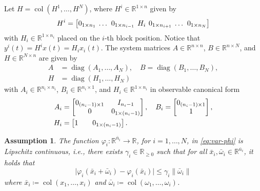 \documentclass[journal]{IEEEtran}
\newtheorem{assumption}{Assumption}
\newcommand{\diag}{\operatorname{diag}}	%
\newcommand{\col}{\operatorname{col}}
\def\colsep{\setlength\arraycolsep}
\begin{document}
Let $H = \col(H^{1},\ldots,H^{N})$, where $H^i \in \mathbb{R}^{1 \times n}$ given by
\begin{equation*}
H^i=\colsep{2pt}\begin{bmatrix}
    0_{1\times n_1} & \dots & 0_{1\times n_{i-1}} & H_i & 0_{1\times n_{i+1}} & \dots & 0_{1\times n_N}
\end{bmatrix}
\end{equation*}
with $H_i\in\mathbb R^{1\times n_i}$ placed on the $i$-th block position. Notice that 
$y^i(t) = H^i x(t) = H_i x_i(t)$. The system matrices ${A\in\mathbb{R}^{n\times n}}$, $B\in\mathbb{R}^{n\times N}$, and $H\in\mathbb{R}^{N\times n}$ are given by
\begin{align*}
    A& = \diag(A_1,\ldots,A_N), \quad B = \diag(B_1,\ldots,B_N), \\
    H& = \diag(H_1, \ldots, H_N)
\end{align*}
with $A_i \in \mathbb{R}^{n_i \times n_i}$, $B_i \in \mathbb{R}^{n_i \times 1}$, and $H_i \in \mathbb{R}^{1 \times n_i}$ in observable canonical form
\begin{align*}
 A_i &=
    \begin{bmatrix}
        0_{(n_i-1)\times 1}  & I_{n_i-1}\\
        0 & 0_{1\times (n_i-1)}
    \end{bmatrix}, \quad B_i =
    \begin{bmatrix}
    0_{(n_i-1 )\times 1}\\
    1
    \end{bmatrix}, \\
    H_i &=
    \colsep{10pt}\begin{bmatrix}
        1 & 0_{1\times(n_i-1)}
    \end{bmatrix}.
\end{align*}

\begin{assumption}\label{as:1}
The function $\varphi_i:\mathbb R^{\bar n_i}\to\mathbb R$, for $i=1,\dots,N$, in \eqref{eq:var-phi} is Lipschitz continuous, i.e., there exists $\gamma_i\in\mathbb R_{\geq 0}$ such that for all $\bar x_i,\bar \omega_i \in \mathbb{R}^{\bar n_i}$, it holds that
\begin{equation}\label{eq:Lipschitz}
    \bigl|\varphi_i(\bar x_i + \bar\omega_i) - \varphi_i(\bar x_i)\bigr| \leq \gamma_i\|\bar\omega_i\|
\end{equation}
where $\bar x_i \coloneqq \col(x_1,\dots,x_i)$ and $\bar \omega_i \coloneqq \col(\omega_1,\dots,\omega_i)$. 
\end{assumption}
\end{document}
